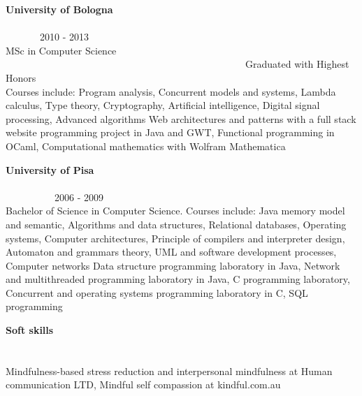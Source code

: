 \begin{resume}
        \textbf{University of Bologna} \ \ \ \ \ \ \ \ \ \ \ \ \ \ \ \ \ \ \ \ \ \ \ \ \ \ \ \ \ \ \ \ \ \ \ \ \ \ \ \ \ \ \ \ \ \ \ \ \ \ \ \ \ \ \ \ \ \ \ \ \ \ \ \ \ \ \ \ \ \ \ \ \ \ \ \ \ \ \ 2010 - 2013 \\
        MSc in Computer Science  \ \ \ \ \ \ \ \ \ \ \ \ \ \ \ \ \ \ \ \ \ \ \ \ \ \ \ \ \ \ \ \ \ \ \ \ \ \ \ \ \ \ \ \ \ \ \ \ \ Graduated with Highest Honors\\
        Courses include:
        Program analysis,
        Concurrent models and systems,
        Lambda calculus,
        Type theory,
        Cryptography,
        Artificial intelligence,
        Digital signal processing,
        Advanced algorithms
        Web architectures and patterns with a full stack website programming project in Java and GWT,
        Functional programming in OCaml, Computational mathematics with Wolfram Mathematica

        \textbf{University of Pisa} \ \ \ \ \ \ \ \ \ \ \ \ \ \ \ \ \ \ \ \ \ \ \ \ \ \ \ \ \ \ \ \ \ \ \ \ \ \ \ \ \ \ \ \ \ \ \ \ \ \ \ \ \ \ \ \ \ \ \ \ \ \ \ \ \ \ \ \ \ \ \ \ \ \ \ \ \ \ \ \ \ \ 2006 - 2009 \\
        Bachelor of Science in Computer Science. Courses include:
        Java memory model and semantic,
        Algorithms and data structures,
        Relational databases,
        Operating systems,
        Computer architectures,
        Principle of compilers and interpreter design,
        Automaton and grammars theory,
        UML and software development processes,
        Computer networks
        Data structure programming laboratory in Java,
        Network and multithreaded programming laboratory in Java,
        C programming laboratory,
        Concurrent and operating systems programming laboratory in C,
        SQL programming


        \textbf{Soft skills}  \ \ \ \ \ \ \ \ \ \ \ \ \ \ \ \ \ \ \ \ \ \ \ \ \ \ \ \ \ \ \ \ \ \ \ \ \ \ \ \ \ \ \ \ \ \ \ \ \ \ \ \ \ \ \ \ \ \ \ \ \ \ \ \ \ \ \ \ \ \ \ \ \ \ \ \ \ \ \ \ \ \ \ \ \ \ \ \ \ \ \ \ \ \ \ \ \ \ \ \ \ \ \ \\
        Mindfulness-based stress reduction and interpersonal mindfulness at Human communication LTD,
        Mindful self compassion at kindful.com.au


\end{resume}
